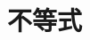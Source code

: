 \chapter{不等式}
\begin{comment}
\section{平均值不等式及其证明}
平均值不等式是最基本的重要不等式之一, 在不等式理论研究和证明中占有重要的位置. 平均值不等式的证明有许多种方法. 这里, 我们选了部分具有代表意义的证明方法, 其中用来证明平均值不等式的许多结论, 其本身又具有重要的意义. 特别是, 在许多竞赛的书籍中, 都有专门的章节介绍和讨论, 如数学归纳法、变量替换、恒等变形和分析综合方法等, 这些也是证明不等式的常用方法和技巧. 希望大家能认真思考和好好掌握, 熟悉不等式的证明.

\section*{1. 1 平均值不等式}
对任意非负实数 $a 、 b$, 有

$$
(\sqrt{a}-\sqrt{b})^{2} \geqslant 0
$$

于是, 得

$$
\frac{a+b}{2} \geqslant \sqrt{a b}
$$

一般地, 假设 $a_{1}, a_{2}, \cdots, a_{n}$ 为 $n$ 个非负实数, 它们的算术平均值记为

$$
A_{n}=\frac{a_{1}+a_{2}+\cdots+a_{n}}{n}
$$

几何平均值记为

$$
G_{n}=\left(a_{1} a_{2} \cdots a_{n}\right)^{\frac{1}{n}}=\sqrt[n]{a_{1} a_{2} \cdots a_{n}}
$$

算术平均值与几何平均值之间有如下的关系

$$
\frac{a_{1}+a_{2}+\cdots+a_{n}}{n} \geqslant \sqrt[n]{a_{1} a_{2} \cdots a_{n}}
$$

即

$$
A_{n} \geqslant G_{n}
$$

当且仅当 $a_{1}=a_{2}=\cdots=a_{n}$ 时, 等号成立.

上述不等式称为平均值不等式,或简称为均值不等式.

平均值不等式的表达形式简单,容易记住,但它的证明和应用非常灵活、广泛, 其证明有多种不同的方法. 为使大家理解和掌握, 这里我们选择了其中的几种典型的证明方法. 当然, 有些方法是几个知识点的结合, 很难将它们归类,有些大体相同或相似,但选择的变量不同,或处理的方式不同,导致证明的难易不同,所以,我们将它们看作是不同的方法.

\section{1. 2 平均值不等式的证明}

\end{comment}
